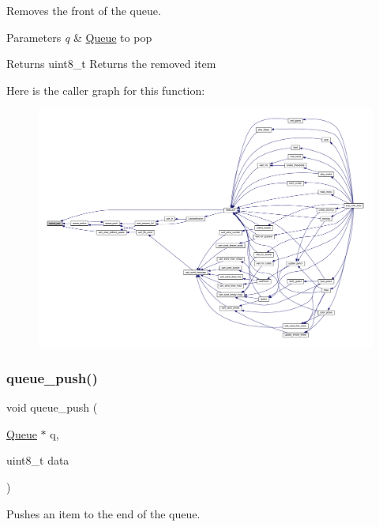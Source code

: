 Removes the front of the queue. 


\begin{DoxyParams}{Parameters}
{\em q} & \mbox{\hyperlink{struct_queue}{Queue}} to pop \\
\hline
\end{DoxyParams}
\begin{DoxyReturn}{Returns}
uint8\+\_\+t Returns the removed item 
\end{DoxyReturn}
Here is the caller graph for this function\+:\nopagebreak
\begin{figure}[H]
\begin{center}
\leavevmode
\includegraphics[width=350pt]{group__queue_gaa7c283555566da64b71864f416e0178a_icgraph}
\end{center}
\end{figure}
\mbox{\label{group__queue_ga056bdcedf660416247cdb05759766702}} 
\subsubsection{\texorpdfstring{queue\+\_\+push()}{queue\_push()}}
{\footnotesize\ttfamily void queue\+\_\+push (\begin{DoxyParamCaption}\item[{\mbox{\hyperlink{struct_queue}{Queue}} $\ast$}]{q,  }\item[{uint8\+\_\+t}]{data }\end{DoxyParamCaption})}



Pushes an item to the end of the queue. 


